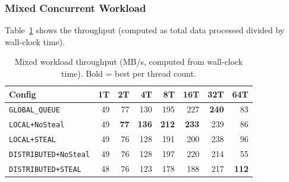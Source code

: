 \subsubsection{Mixed Concurrent Workload}

Table~\ref{tab:ds-mixed} shows the throughput (computed as total data processed divided by wall-clock time).

\begin{table}[h]
\centering
\caption{Mixed workload throughput (MB/s, computed from wall-clock time). Bold = best per thread count.}
\label{tab:ds-mixed}
\begin{tabular}{l|rrrrrrr}
\hline
\textbf{Config} & \textbf{1T} & \textbf{2T} & \textbf{4T} & \textbf{8T} & \textbf{16T} & \textbf{32T} & \textbf{64T} \\
\hline
\texttt{GLOBAL\_QUEUE}       & 49 & 77 & 130 & 195 & 227 & \textbf{240} & 83 \\
\texttt{LOCAL+NoSteal}       & 49 & \textbf{77} & \textbf{136} & \textbf{212} & \textbf{233} & 239 & 86 \\
\texttt{LOCAL+STEAL}         & 49 & 76 & 128 & 191 & 200 & 238 & 96 \\
\texttt{DISTRIBUTED+NoSteal} & 49 & 76 & 128 & 197 & 220 & 214 & 55 \\
\texttt{DISTRIBUTED+STEAL}   & 48 & 76 & 123 & 178 & 188 & 217 & \textbf{112} \\
\hline
\end{tabular}
\end{table}

